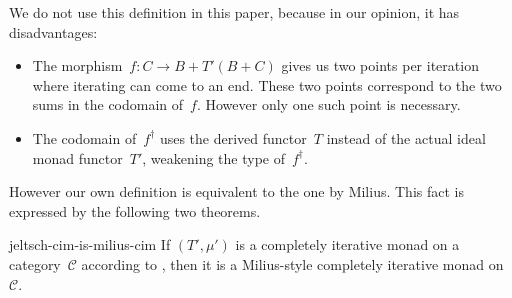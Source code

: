 \documentclass[copyright,creativecommons]{eptcs}
\begin{document}
We do not use this definition in this paper, because in our opinion, it has
disadvantages:
\begin{itemize}

\item

The morphism~$f : C → B + T′(B + C)$ gives us two points per iteration where
iterating can come to an end. These two points correspond to the two sums in the
codomain of~$f$. However only one such point is necessary.


\item

The codomain of~$f^†$ uses the derived functor~$T$ instead of the actual ideal
monad functor~$T′$, weakening the type of~$f^†$.

\end{itemize}
However our own definition is equivalent to the one by Milius. This fact is
expressed by the following two theorems.

\begin{exttheorem}{jeltsch-cim-is-milius-cim}
If $(T′, μ′)$ is a completely iterative monad on a category~$𝒞$ according to
, then it is a Milius-style completely
iterative monad on~$𝒞$.
\end{exttheorem}
\end{document}
